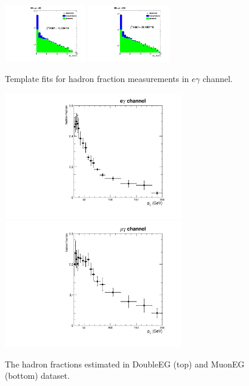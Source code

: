 \documentclass[thesis.tex]{subfiles}
\renewcommand\_{\textunderscore\allowbreak}
\begin{document}
\begin{figure}[hbtp]
   \includegraphics[width=0.32\textwidth]{Figures/frac-80-90_ChIso-DoubleEG-ReMiniAOD.pdf}   \includegraphics[width=0.32\textwidth]{Figures/frac-90-120_ChIso-DoubleEG-ReMiniAOD.pdf}   \\
  \caption{Template fits for hadron fraction measurements in $e\gamma$ channel.}
 \label{fig:DoubleEGjetfakebins}
\end{figure}

\begin{figure}[hbtp]
  \centering
    \includegraphics[width=0.7\textwidth]{Figures/JetFakePho_DoubleEG_ReMiniAOD.pdf} \\
    \includegraphics[width=0.7\textwidth]{Figures/JetFakePho_MuonEG_ReMiniAOD.pdf}
  \caption{The hadron fractions estimated in DoubleEG (top) and MuonEG (bottom) dataset.} 
    \label{fig:hadronfraction}
\end{figure}
\end{document}
